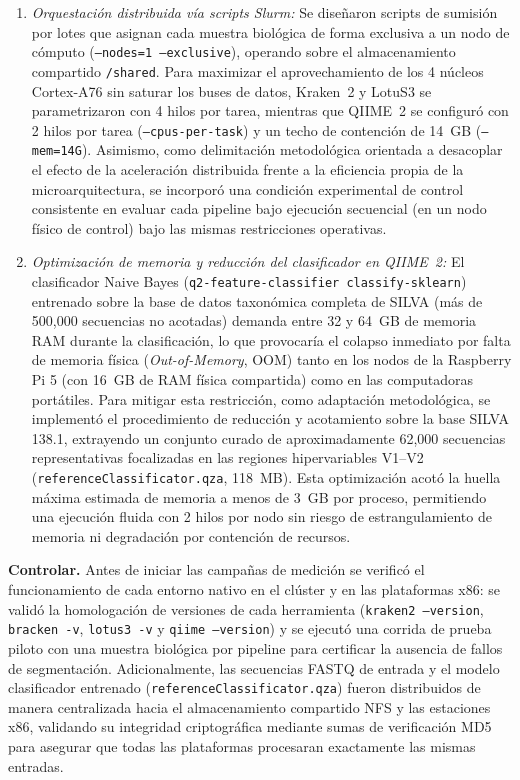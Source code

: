 \documentclass[12pt,oneside,spanish]{book}
\begin{document}
\begin{enumerate}
    
        \item \textit{Orquestación distribuida vía scripts Slurm:} Se diseñaron scripts de sumisión por lotes que asignan cada muestra biológica de forma exclusiva a un nodo de cómputo (\texttt{--nodes=1 --exclusive}), operando sobre el almacenamiento compartido \texttt{/shared}. Para maximizar el aprovechamiento de los 4 núcleos Cortex-A76 sin saturar los buses de datos, Kraken~2 y LotuS3 se parametrizaron con 4 hilos por tarea, mientras que QIIME~2 se configuró con 2 hilos por tarea (\texttt{--cpus-per-task}) y un techo de contención de 14~GB (\texttt{--mem=14G}). Asimismo, como delimitación metodológica orientada a desacoplar el efecto de la aceleración distribuida frente a la eficiencia propia de la microarquitectura, se incorporó una condición experimental de control consistente en evaluar cada pipeline bajo ejecución secuencial (en un nodo físico de control) bajo las mismas restricciones operativas.
    
        \item \textit{Optimización de memoria y reducción del clasificador en QIIME~2:} El clasificador Naive Bayes (\texttt{q2-feature-classifier classify-sklearn}) entrenado sobre la base de datos taxonómica completa de SILVA (más de 500,000 secuencias no acotadas) demanda entre 32 y 64~GB de memoria RAM durante la clasificación, lo que provocaría el colapso inmediato por falta de memoria física (\textit{Out-of-Memory}, OOM) tanto en los nodos de la Raspberry Pi 5 (con 16~GB de RAM física compartida) como en las computadoras portátiles. Para mitigar esta restricción, como adaptación metodológica, se implementó el procedimiento de reducción y acotamiento sobre la base SILVA 138.1, extrayendo un conjunto curado de aproximadamente 62,000 secuencias representativas focalizadas en las regiones hipervariables V1--V2 (\texttt{referenceClassificator.qza}, 118~MB). Esta optimización acotó la huella máxima estimada de memoria a menos de 3~GB por proceso, permitiendo una ejecución fluida con 2 hilos por nodo sin riesgo de estrangulamiento de memoria ni degradación por contención de recursos.
    \end{enumerate}
    
    \textbf{Controlar.} Antes de iniciar las campañas de medición se verificó el funcionamiento de cada entorno nativo en el clúster y en las plataformas x86: se validó la homologación de versiones de cada herramienta (\texttt{kraken2 --version}, \texttt{bracken -v}, \texttt{lotus3 -v} y \texttt{qiime --version}) y se ejecutó una corrida de prueba piloto con una muestra biológica por pipeline para certificar la ausencia de fallos de segmentación. Adicionalmente, las secuencias FASTQ de entrada y el modelo clasificador entrenado (\texttt{referenceClassificator.qza}) fueron distribuidos de manera centralizada hacia el almacenamiento compartido NFS y las estaciones x86, validando su integridad criptográfica mediante sumas de verificación MD5 para asegurar que todas las plataformas procesaran exactamente las mismas entradas.
    
\end{document}
